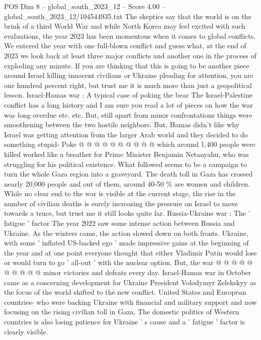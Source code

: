 \begin{textsample}{POS Dim 8 – global\_south\_2023\_12 – Score 4.00 – global\_south\_2023\_12/104544935.txt}  \label{ex:f8_pos_432}
The skeptics say that the world is on the brink of a third World War and while North Korea may feel excited with such evaluations, the year 2023 has been momentous when it comes to global conflicts.
We entered the year with one full-blown conflict and guess what, at the end of 2023 we look back at least three major conflicts and another one in the process of exploding any minute.
If you are thinking that this is going to be another piece around Israel killing innocent civilians or Ukraine pleading for attention, you are one hundred percent right, but trust me it is much more than just a geopolitical lesson.
Israel-Hamas war : A typical case of poking the bear The Israel-Palestine conflict has a long history and I am sure you read a lot of pieces on how the war was long overdue etc. etc.
But, still apart from minor confrontations things were smoothening between the two hostile neighbors.
But, Hamas didn't like why Israel was getting attention from the larger Arab world and they decided to do something stupid- Poke @ @ @ @ @ @ @ @ @ @ which around 1,400 people were killed worked like a breather for Prime Minister Benjamin Netanyahu, who was struggling for his political existence.
What followed seems to be a campaign to turn the whole Gaza region into a graveyard.
The death toll in Gaza has crossed nearly 20,000 people and out of them, around 40-50 \% are women and children.
While no clear end to the war is visible at the current stage, the rise in the number of civilian deaths is surely increasing the pressure on Israel to move towards a truce, but trust me it still looks quite far.
Russia-Ukraine war : The ' fatigue ' factor The year 2022 saw some intense action between Russia and Ukraine.
As the winters came, the action slowed down on both fronts.
Ukraine, with some ' inflated US-backed ego ' made impressive gains at the beginning of the year and at one point everyone thought that either Vladimir Putin would lose or would turn to go ' all-out ' with the nuclear option.
But, the war @ @ @ @ @ @ @ @ @ @ minor victories and defeats every day.
Israel-Hamas war in October came as a concerning development for Ukraine President Volodymyr Zelekskyy as the focus of the world shifted to the new conflict.
United States and European countries- who were backing Ukraine with financial and military support and now focusing on the rising civilian toll in Gaza.
The domestic politics of Western countries is also losing patience for Ukraine ' s cause and a ' fatigue ' factor is clearly visible.

\end{textsample}
